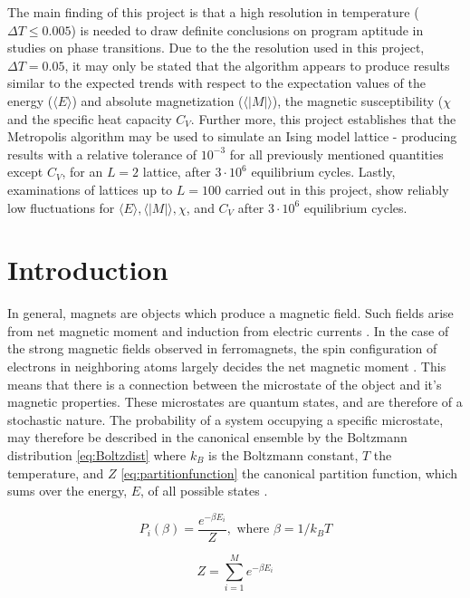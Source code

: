 \documentclass[%
oneside,                 %
final,                   %
10pt]{article}
\begin{document}
The main finding of this project is that a high resolution in temperature ($\Delta T \leq 0.005 $) is needed to draw definite conclusions on program aptitude in studies on phase transitions. Due to the the resolution used in this project, $\Delta T = 0.05$, it may only be stated that the algorithm appears to produce results similar to the expected trends with respect to the expectation values of the energy ($\langle E \rangle$) and absolute magnetization ($\langle |M| \rangle$), the magnetic susceptibility ($\chi$and the specific heat capacity $ C_V$. Further more, this project establishes that the Metropolis algorithm may be used to simulate an Ising model lattice - producing results with a relative tolerance of $10^{-3}$ for all previously mentioned quantities except $C_V$,
for an $L=2$ lattice, after $3\cdot 10^6$ equilibrium cycles. Lastly, examinations of lattices up to $L=100$ carried out in this project, show reliably low fluctuations for $\langle E \rangle, \langle |M| \rangle, \chi$, and $C_V$ after  $3\cdot 10^6$ equilibrium cycles.


\section{Introduction}


In general, magnets are objects which produce a magnetic field. Such fields arise from net magnetic moment and induction from electric currents  \cite{FeynmanMM}. In the case of the strong magnetic fields observed in ferromagnets, the spin configuration of electrons in neighboring atoms largely decides the net magnetic moment \cite{FeynmanFM}. This means that there is a connection between the microstate of the object and it's magnetic properties. These microstates are quantum states, and are therefore of a stochastic nature. The probability of a system occupying a specific microstate, may therefore be described in the canonical ensemble by the Boltzmann distribution \eqref{eq:Boltzdist} where $k_B$ is the Boltzmann constant, $T$ the temperature,  and $Z$ \eqref{eq:partitionfunction} the canonical partition function, which sums over the energy, $E$, of all possible states \cite{HJ-SP}. 

\begin{equation}
P_i(\beta)=\frac{e^{-\beta E_i}}{Z}, \text{ where }\beta=1/k_BT 
\label{eq:Boltzdist}
\end{equation}

\begin{equation}
Z=\sum_{i=1}^M e^{-\beta E_i}
\label{eq:partitionfunction}
\end{equation}
\end{document}
